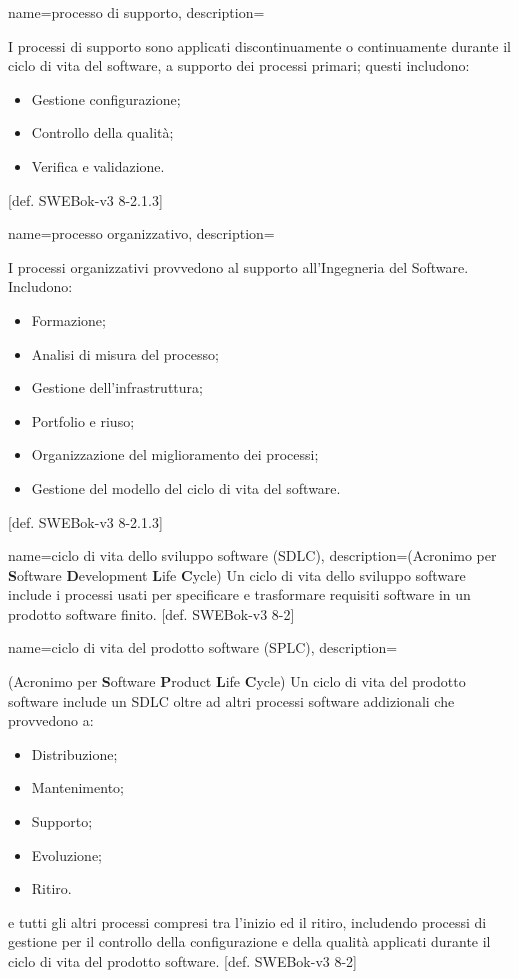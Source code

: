 {
name=processo di supporto,
description={I processi di supporto sono applicati discontinuamente o continuamente durante il ciclo di vita del software, a supporto dei processi primari; questi includono:\begin{itemize}
\item Gestione configurazione;
\item Controllo della qualit\`a;
\item Verifica e validazione.
\end{itemize}
[def. SWEBok-v3 8-2.1.3]}
}

{
name=processo organizzativo,
description={I processi organizzativi provvedono al supporto all'Ingegneria del Software. Includono: \begin{itemize}
\item Formazione;
\item Analisi di misura del processo;
\item Gestione dell'infrastruttura;
\item Portfolio e riuso;
\item Organizzazione del miglioramento dei processi;
\item Gestione del modello del ciclo di vita del software.
\end{itemize}
[def. SWEBok-v3 8-2.1.3]}
}

{
name=ciclo di vita dello sviluppo software (SDLC),
description={(Acronimo per \textbf{S}oftware \textbf{D}evelopment \textbf{L}ife \textbf{C}ycle) Un ciclo di vita dello sviluppo software include i processi usati per specificare e trasformare requisiti software in un prodotto software finito. [def. SWEBok-v3 8-2]}
}

{
name=ciclo di vita del prodotto software (SPLC),
description={(Acronimo per \textbf{S}oftware \textbf{P}roduct \textbf{L}ife \textbf{C}ycle) Un ciclo di vita del prodotto software include un SDLC oltre ad altri processi software addizionali che provvedono a: \begin{itemize}
\item Distribuzione;
\item Mantenimento;
\item Supporto;
\item Evoluzione;
\item Ritiro.
\end{itemize}
e tutti gli altri processi compresi tra l'inizio ed il ritiro, includendo processi di gestione per il controllo della configurazione e della qualit\`a applicati durante il ciclo di vita del prodotto software. [def. SWEBok-v3 8-2]}
}

